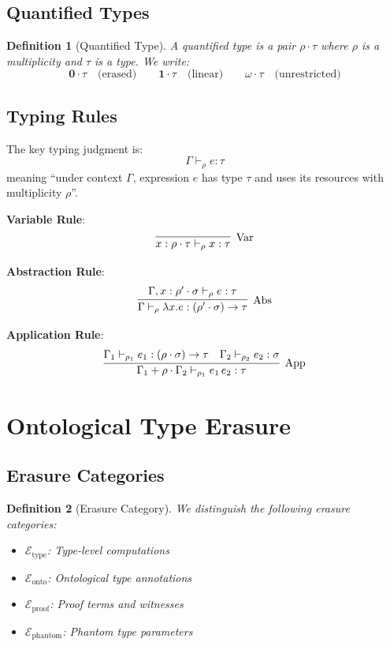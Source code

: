 \documentclass[11pt]{article}
\newtheorem{definition}{Definition}
\newcommand{\mult}{\rho}
\newcommand{\zero}{\mathbf{0}}
\newcommand{\one}{\mathbf{1}}
\newcommand{\many}{\omega}
\begin{document}
\subsection{Quantified Types}

\begin{definition}[Quantified Type]
A quantified type is a pair $\mult \cdot \tau$ where $\mult$ is a multiplicity
and $\tau$ is a type. We write:
\[
\zero \cdot \tau \quad \text{(erased)} \qquad
\one \cdot \tau \quad \text{(linear)} \qquad
\many \cdot \tau \quad \text{(unrestricted)}
\]
\end{definition}

\subsection{Typing Rules}

The key typing judgment is:
\[
\Gamma \vdash_\mult e : \tau
\]
meaning ``under context $\Gamma$, expression $e$ has type $\tau$ and uses
its resources with multiplicity $\mult$''.

\textbf{Variable Rule}:
\[
\infer[\text{Var}]{x : \mult \cdot \tau \vdash_\mult x : \tau}{}
\]

\textbf{Abstraction Rule}:
\[
\infer[\text{Abs}]{\Gamma \vdash_\mult \lambda x. e : (\mult' \cdot \sigma) \to \tau}
      {\Gamma, x : \mult' \cdot \sigma \vdash_\mult e : \tau}
\]

\textbf{Application Rule}:
\[
\infer[\text{App}]{\Gamma_1 + \mult \cdot \Gamma_2 \vdash_{\mult_1} e_1\,e_2 : \tau}
      {\Gamma_1 \vdash_{\mult_1} e_1 : (\mult \cdot \sigma) \to \tau &
       \Gamma_2 \vdash_{\mult_2} e_2 : \sigma}
\]

\section{Ontological Type Erasure}

\subsection{Erasure Categories}

\begin{definition}[Erasure Category]
We distinguish the following erasure categories:
\begin{itemize}
\item $\mathcal{E}_{\text{type}}$: Type-level computations
\item $\mathcal{E}_{\text{onto}}$: Ontological type annotations
\item $\mathcal{E}_{\text{proof}}$: Proof terms and witnesses
\item $\mathcal{E}_{\text{phantom}}$: Phantom type parameters
\end{itemize}
\end{definition}
\end{document}
